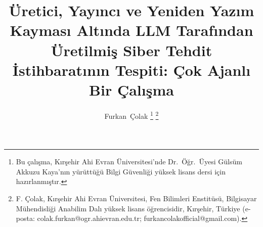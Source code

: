 \documentclass[journal]{IEEEtran}
\begin{document}
\renewcommand{\figurename}{Şekil}
\renewcommand{\tablename}{Tablo}

\title{Üretici, Yayıncı ve Yeniden Yazım Kayması Altında LLM Tarafından Üretilmiş Siber Tehdit İstihbaratının
Tespiti: Çok Ajanlı Bir Çalışma}

\author{Furkan~\c{C}olak%
\thanks{Bu çalışma, Kırşehir Ahi Evran Üniversitesi'nde Dr.\ Öğr.\ Üyesi Gülsüm Akkuzu Kaya'nın yürüttüğü Bilgi
Güvenliği yüksek lisans dersi için hazırlanmıştır.}%
\thanks{F. \c{C}olak, Kırşehir Ahi Evran Üniversitesi, Fen Bilimleri Enstitüsü, Bilgisayar Mühendisliği Anabilim Dalı
yüksek lisans öğrencisidir, Kırşehir, Türkiye (e-posta: colak.furkan@ogr.ahievran.edu.tr;
furkancolakofficial@gmail.com).}}


\maketitle
\end{document}
